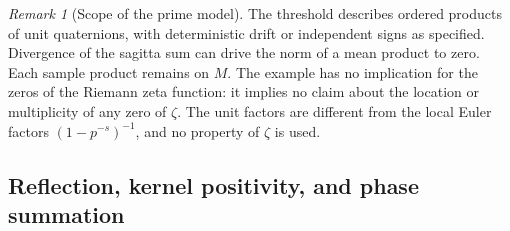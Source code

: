 \documentclass[11pt,reqno]{amsart}
\theoremstyle{definition}
\theoremstyle{remark}
\newtheorem{remark}[theorem]{Remark}
\numberwithin{equation}{section}
\begin{document}
\begin{remark}[Scope of the prime model]\label{m6:prime-scope}
The threshold describes ordered products of unit quaternions,
with deterministic drift or independent signs as specified.
Divergence of the sagitta sum can drive the norm of a mean
product to zero. Each sample product remains on \(M\).
The example has no implication for the zeros of the Riemann zeta function: it implies no claim about the location or multiplicity
of any zero of \(\zeta\). The unit factors are different from the
local Euler factors \((1-p^{-s})^{-1}\), and no property of \(\zeta\) is used.
\end{remark}

\subsection{Reflection, kernel positivity, and phase summation}
\end{document}
